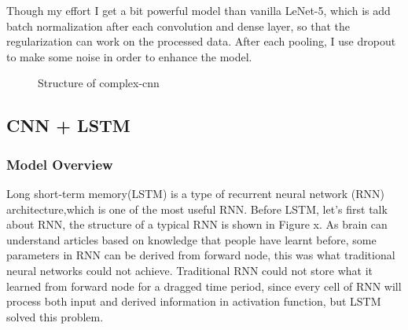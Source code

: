 \documentclass{article}
\begin{document}
Though my effort I get a bit powerful model than vanilla LeNet-5, which is add batch normalization after each convolution and dense layer, so that the regularization can work on the processed data. After each pooling, I use dropout to make some noise in order to enhance the model. 
 

\begin{figure}[h]
	\centering
	\caption{Structure of complex-cnn}
\end{figure} 


\subsection{CNN + LSTM}
\subsubsection{Model Overview}
Long short-term memory(LSTM) is a type of recurrent neural network (RNN) architecture,which is one of the most useful RNN.  Before LSTM, let's first talk about RNN, the structure of a typical RNN is shown in Figure x. As brain can understand articles based on knowledge that people have learnt before, some parameters in RNN can be derived from forward node, this was what traditional neural networks could not achieve. Traditional RNN could not store what it learned from forward node for a dragged time period, since every cell of RNN will process both input and derived information in activation function, but LSTM solved this problem.
\end{document}
